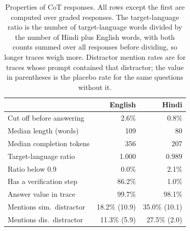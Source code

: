 \begin{table}[t]
\centering
\small
\setlength{\tabcolsep}{4pt}
\begin{tabular}{lrr}
\toprule
 & English & Hindi \\
\midrule
Cut off before answering & 2.6\% & 0.8\% \\
Median length (words) & 109 & 80 \\
Median completion tokens & 356 & 207 \\
Target-language ratio & 1.000 & 0.989 \\
Ratio below 0.9 & 0.0\% & 2.1\% \\
Has a verification step & 86.2\% & 1.0\% \\
Answer value in trace & 99.7\% & 98.1\% \\
Mentions sim.\ distractor & 18.2\% (10.9) & 35.0\% (10.1) \\
Mentions dis.\ distractor & 11.3\% (5.9) & 27.5\% (2.0) \\
\bottomrule
\end{tabular}
\caption{Properties of CoT responses. All rows except the first are computed over graded responses. The target-language ratio is the number of target-language words divided by the number of Hindi plus English words, with both counts summed over all responses before dividing, so longer traces weigh more. Distractor mention rates are for traces whose prompt contained that distractor; the value in parentheses is the placebo rate for the same questions without it.}
\label{tab:trace}
\end{table}
